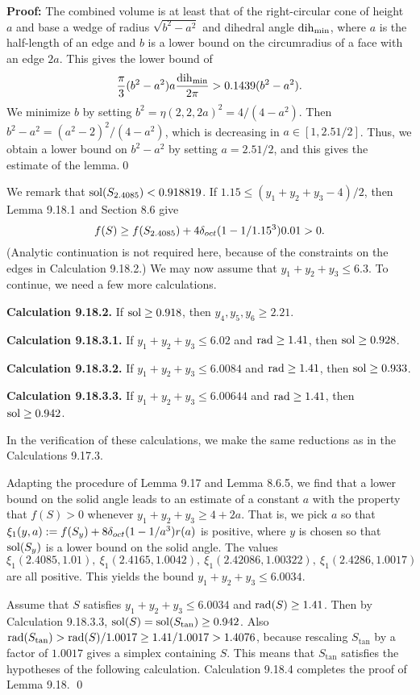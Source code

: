 {\bf Proof:}  The combined volume is at least that
of the right-circular cone of height $a$ and base a 
wedge of
radius $\sqrt{b^2-a^2}$ and dihedral angle  $\operatorname{dih}_{\min}$,
where $a$ is the half-length of an edge and $b$ is a lower
bound on the circumradius of a face with an edge $2a$.
This gives the lower bound of $$
{\pi\over 3}(b^2-a^2)a {\operatorname{dih}_{\min}\over 2\pi}>0.1439
(b^2-a^2).$$  
We minimize $b$ by setting $b^2=\eta(2,2,2a)^2=4/(4-a^2)$.
Then $b^2-a^2= (a^2-2)^2/(4-a^2)$, which is decreasing in $a\in[1,2.51/2]$.
  Thus, we obtain a lower bound on $b^2-a^2$ by setting
$a=2.51/2$, and this gives the estimate of the lemma.\qed

We remark that $\operatorname{sol}(S_{2.4085})<0.918819$.
If $1.15\le (y_1+y_2+y_3-4)/2$, then Lemma 9.18.1
and Section 8.6 give
$$f(S)\ge f(S_{2.4085}) + 4\delta_{oct} (1-1/1.15^3) 0.01> 0.$$
(Analytic continuation is not required here, because of the constraints
on the edges in Calculation 9.18.2.)
We may now assume that $y_1+y_2+y_3\le 6.3$.
To continue, we
need a few more calculations.



{\bf Calculation 9.18.2.}  If $\operatorname{sol}\ge 0.918$, then
$y_4, y_5, y_6\ge 2.21$. 

{\bf Calculation 9.18.3.1.} If $y_1+y_2+y_3\le 6.02$ and $\operatorname{rad}\ge1.41$,
then $\operatorname{sol}\ge 0.928$. 

{\bf Calculation 9.18.3.2.} If $y_1+y_2+y_3\le 6.0084$ and $\operatorname{rad}\ge1.41$,
then $\operatorname{sol}\ge 0.933$.  

{\bf Calculation 9.18.3.3.}  If $y_1+y_2+y_3\le 6.00644$ and $\operatorname{rad}\ge1.41$,
then $\operatorname{sol}\ge 0.942$. 

In the verification of these calculations, we make the same
reductions as in the Calculations 9.17.3.


Adapting the procedure of
Lemma 9.17 and Lemma 8.6.5, 
we find that a lower bound on the solid angle leads
to an estimate of a constant $a$ with the property that 
$f(S)>0$ whenever $y_1+y_2+y_3\ge 4+2a$.  
That is, we pick $a$ so that
$\xi_1(y,a):=f(S_y)+8\delta_{oct}(1-1/a^3)r(a)$ is positive, where
$y$ is chosen so that $\operatorname{sol}(S_y)$ is a lower bound
on the solid angle.  
The values
$$\xi_1(2.4085,1.01),\ \xi_1(2.4165,1.0042),\ \xi_1(2.42086,1.00322),\ 
\xi_1(2.4286,1.0017)$$
are all positive.
This yields the bound
$y_1+y_2+y_3\le 6.0034$.

Assume that $S$ satisfies $y_1+y_2+y_3\le 6.0034$ and
$\operatorname{rad}(S)\ge 1.41$.  Then by Calculation 9.18.3.3,
$\operatorname{sol}(S)=\operatorname{sol}(S_{\tan})\ge 0.942$. Also
$\operatorname{rad}(S_{\tan}) > \operatorname{rad}(S)/1.0017\ge1.41/1.0017 > 1.4076$, because
rescaling $S_{\tan}$ by a factor of $1.0017$ gives
a simplex containing  $S$.  This means that $S_{\tan}$
satisfies the hypotheses of the following calculation.
Calculation 9.18.4 completes the proof of
Lemma 9.18. \qed

